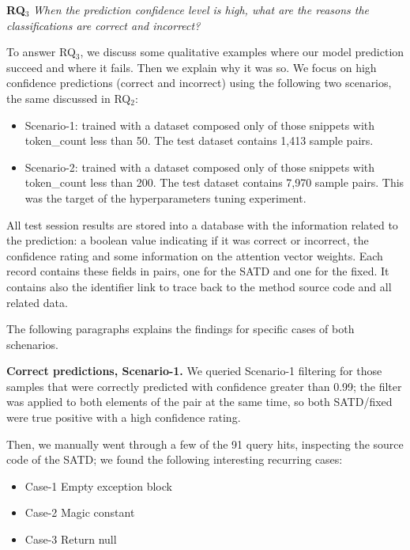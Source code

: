 \textbf{RQ$_3$} \textit{When the prediction confidence level is high, what are the reasons the classifications are correct and incorrect?}

To answer RQ$_3$, we discuss some qualitative examples where our model prediction succeed and where it fails. Then we explain why it was so.
We focus on high confidence predictions (correct and incorrect) using the following two scenarios, the same discussed in RQ$_2$:
\begin{itemize}
    \item Scenario-1: trained with a dataset composed only of those snippets with token\_count less than 50. The test dataset contains 1,413 sample pairs.
    \item Scenario-2: trained with a dataset composed only of those snippets with token\_count less than 200. The test dataset contains 7,970 sample pairs. This was the target of the hyperparameters tuning experiment.
\end{itemize}

All test session results are stored into a database with the information related to the prediction: a boolean value indicating if it was correct or incorrect, the confidence rating and some information on the attention vector weights. Each record contains these fields in pairs, one for the SATD and one for the fixed. It contains also the identifier link to trace back to the method source code and all related data.

The following paragraphs explains the findings for specific cases of both schenarios.

\textbf{Correct predictions, Scenario-1.} We queried Scenario-1 filtering for those samples that were correctly predicted with confidence greater than 0.99; the filter was applied to both elements of the pair at the same time, so both SATD/fixed were true positive with a high confidence rating.

Then, we manually went through a few of the 91 query hits, inspecting the source code of the SATD; we found the following interesting recurring cases:
\begin{itemize}
    \item Case-1 Empty exception block %
    \item Case-2 Magic constant %
    \item Case-3 Return null %
\end{itemize}

